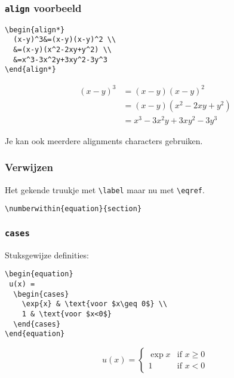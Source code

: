 \begin{frame}[fragile]
  \frametitle{\texttt{align} voorbeeld}

  \footnotesize
  \begin{verbatim}
\begin{align*}
  (x-y)^3&=(x-y)(x-y)^2 \\
  &=(x-y)(x^2-2xy+y^2) \\
  &=x^3-3x^2y+3xy^2-3y^3
\end{align*}
  \end{verbatim}
\begin{align*}
  (x-y)^3&=(x-y)(x-y)^2 \\
  &=(x-y)(x^2-2xy+y^2) \\
  &=x^3-3x^2y+3xy^2-3y^3
\end{align*}

Je kan ook meerdere alignments characters gebruiken.
\end{frame}

\begin{frame}[fragile]
  \frametitle{Verwijzen}

  Het gekende truukje met \verb|\label| maar nu met \verb|\eqref|.

  \begin{verbatim}
\numberwithin{equation}{section}
  \end{verbatim}
\end{frame}

\begin{frame}[fragile]
  \frametitle{\texttt{cases}}

  Stuksgewijze definities:
  \begin{verbatim}
\begin{equation}
 u(x) =
  \begin{cases}
    \exp{x} & \text{voor $x\geq 0$} \\
    1 & \text{voor $x<0$}
  \end{cases}
\end{equation}
  \end{verbatim}
\begin{equation}
 u(x) =
  \begin{cases}
    \exp{x} & \text{if $x\geq 0$} \\
    1 & \text{if $x < 0$}
  \end{cases}
\end{equation}
\end{frame}

